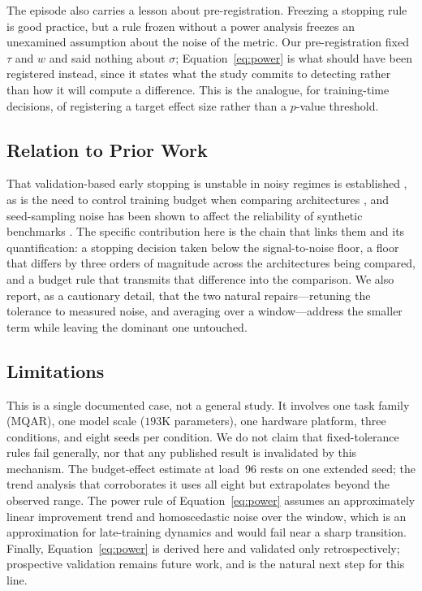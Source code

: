 \documentclass[jou,11pt,donotrepeattitle]{apa7}
\begin{document}
The episode also carries a lesson about pre-registration. Freezing a stopping rule is good
practice, but a rule frozen without a power analysis freezes an unexamined assumption about the
noise of the metric. Our pre-registration fixed $\tau$ and $w$ and said nothing about $\sigma$;
Equation~\ref{eq:power} is what should have been registered instead, since it states what the
study commits to detecting rather than how it will compute a difference. This is the analogue,
for training-time decisions, of registering a target effect size rather than a $p$-value
threshold.

\subsection{Relation to Prior Work}

That validation-based early stopping is unstable in noisy regimes is established
\parencite{prechelt1998automatic}, as is the need to control training budget when comparing
architectures \parencite{li2019budgeted}, and seed-sampling noise has been shown to affect the
reliability of synthetic benchmarks \parencite{chanin2026reliable}. The specific contribution here
is the chain that links them and its quantification: a stopping decision taken below the
signal-to-noise floor, a floor that differs by three orders of magnitude across the architectures
being compared, and a budget rule that transmits that difference into the comparison. We also
report, as a cautionary detail, that the two natural repairs---retuning the tolerance to measured
noise, and averaging over a window---address the smaller term while leaving the dominant one
untouched.

\subsection{Limitations}

This is a single documented case, not a general study. It involves one task family (MQAR), one
model scale ($193$K parameters), one hardware platform, three conditions, and eight seeds per
condition. We do not claim that fixed-tolerance rules fail generally, nor that any published
result is invalidated by this mechanism. The budget-effect estimate at load~96 rests on one
extended seed; the trend analysis that corroborates it uses all eight but extrapolates beyond
the observed range. The power rule of Equation~\ref{eq:power} assumes an approximately linear
improvement trend and homoscedastic noise over the window, which is an approximation for
late-training dynamics and would fail near a sharp transition. Finally, Equation~\ref{eq:power}
is derived here and validated only retrospectively; prospective validation remains future work,
and is the natural next step for this line.
\end{document}
